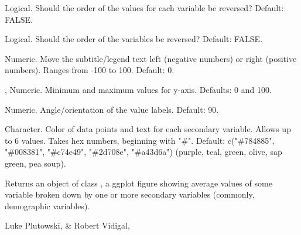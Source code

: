 \documentclass[a4paper]{book}
\begin{document}
\begin{Arguments}
\begin{ldescription}
\item[\code{rev\_values}] Logical.  Should the order of the values for each variable be reversed?  Default: FALSE.

\item[\code{rev\_variables}] Logical.  Should the order of the variables be reversed?  Default: FALSE.

\item[\code{subtitle\_h\_just}] Numeric.  Move the subtitle/legend text left (negative numbers) or right (positive numbers).
Ranges from -100 to 100.  Default: 0.

\item[\code{ymin}, \code{ymax}] Numeric.  Minimum and maximum values for y-axis. Defaults: 0 and 100.

\item[\code{x\_lab\_angle}] Numeric.  Angle/orientation of the value labels.  Default: 90.

\item[\code{color\_scheme}] Character.  Color of data points and text for each secondary variable.  Allows up to 6 values.
Takes hex numbers, beginning with "\#".
Default: c("\#784885", "\#008381", "\#c74e49", "\#2d708e", "\#a43d6a")
(purple, teal, green, olive, sap green, pea soup).
\end{ldescription}
\end{Arguments}
%
\begin{Value}
Returns an object of class , a ggplot figure showing
average values of some variable broken down by one or more secondary variables
(commonly, demographic variables).
\end{Value}
%
\begin{Author}
Luke Plutowski,  \& Robert Vidigal, 
\end{Author}
%
\end{document}
